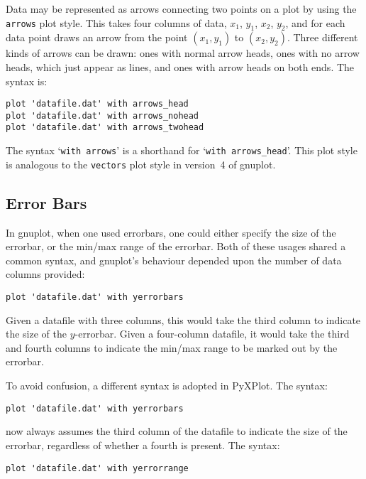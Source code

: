 Data may be represented as arrows connecting two points on a plot by using the
{\tt arrows} plot style.
This takes four columns of data, $x_1$, $y_1$, $x_2$, $y_2$, and for each data
point draws an arrow from the point $(x_1,y_1)$ to $(x_2,y_2)$.  Three
different kinds of arrows can be drawn: ones with normal arrow heads, ones with
no arrow heads, which just appear as lines, and ones with arrow heads on both
ends. The syntax is:

\begin{verbatim}
plot 'datafile.dat' with arrows_head
plot 'datafile.dat' with arrows_nohead
plot 'datafile.dat' with arrows_twohead
\end{verbatim}

The syntax `{\tt with arrows}' is a shorthand for `{\tt with
arrows\_head}'. This plot style is analogous to the {\tt vectors} plot style in
version~4 of gnuplot.

\subsection{Error Bars}

\label{errorbars}
In gnuplot, when one used errorbars, one could either specify the size of the
errorbar, or the min/max range of the errorbar. Both of these usages shared a
common syntax, and gnuplot's behaviour depended upon the number of data columns
provided:

\begin{verbatim}
plot 'datafile.dat' with yerrorbars
\end{verbatim}

\noindent Given a datafile with three columns, this would take the third column
to indicate the size of the $y$-errorbar. Given a four-column datafile, it
would take the third and fourth columns to indicate the min/max range to be
marked out by the errorbar.

To avoid confusion, a different syntax is adopted in PyXPlot. The syntax:

\begin{verbatim}
plot 'datafile.dat' with yerrorbars
\end{verbatim}

\noindent now always assumes the third column of the datafile to indicate the
size of the errorbar, regardless of whether a fourth is present. The syntax:

\begin{verbatim}
plot 'datafile.dat' with yerrorrange
\end{verbatim}

